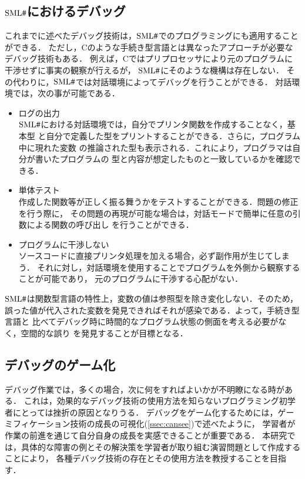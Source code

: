 \documentclass{jreport}
\newcommand\SMLSharp{$\mbox{SML\fontfamily{ptm}\selectfont\#}$}
\begin{document}
\subsection{\SMLSharp におけるデバッグ}
\label{sec:smldebug}
これまでに述べたデバッグ技術は，\SMLSharp{}でのプログラミングにも適用することができる．
ただし，Cのような手続き型言語とは異なったアプローチが必要なデバッグ技術もある．
例えば，Cではプリプロセッサにより元のプログラムに干渉せずに事実の観察が行えるが，
\SMLSharp{}にそのような機構は存在しない．
その代わりに，\SMLSharp では対話環境によってデバッグを行うことができる．
対話環境では，次の事が可能である．

\begin{itemize}
  \item ログの出力\\
  \SMLSharp における対話環境では，自分でプリンタ関数を作成することなく，基本型
  と自分で定義した型をプリントすることができる．さらに，プログラム中に現れた変数
  の推論された型も表示される．これにより，プログラマは自分が書いたプログラムの
  型と内容が想定したものと一致しているかを確認できる．
  \item 単体テスト\\
  作成した関数等が正しく振る舞うかをテストすることができる．問題の修正を行う際に，
  その問題の再現が可能な場合は，対話モードで簡単に任意の引数による関数の呼び出し
  を行うことができる．
  \item プログラムに干渉しない\\
  ソースコードに直接プリンタ処理を加える場合，必ず副作用が生じてしまう．
  それに対し，対話環境を使用することでプログラムを外側から観察することが可能であり，
  元のプログラムに干渉する心配がない．
\end{itemize}

\SMLSharp は関数型言語の特性上，変数の値は参照型を除き変化しない．そのため，
誤った値が代入された変数を発見できればそれが感染である．よって，手続き型言語と
比べてデバッグ時に時間的なプログラム状態の側面を考える必要がなく，空間的な誤り
を発見することが目標となる．

\subsection{デバッグのゲーム化}

デバッグ作業では，多くの場合，次に何をすればよいかが不明瞭になる時がある．
これは，効果的なデバッグ技術の使用方法を知らないプログラミング初学者にとっては挫折の原因となりうる．
デバッグをゲーム化するためには，ゲーミフィケーション技術の成長の可視化(\ref{ssec:cansee})で述べたように，
学習者が作業の前進を通じて自分自身の成長を実感できることが重要である．
本研究では，具体的な障害の例とその解決策を学習者が取り組む演習問題として作成することにより，
各種デバッグ技術の存在とその使用方法を教授することを目指す．
\end{document}
